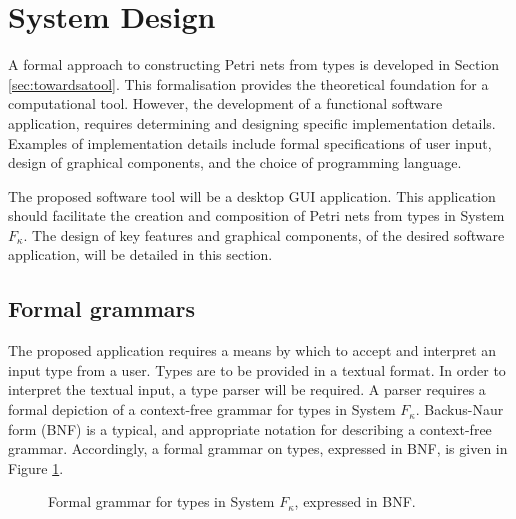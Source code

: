 \documentclass[../Dissertation.tex]{subfiles}
\begin{document}
\section{System Design}
A formal approach to constructing Petri nets from types is developed in Section \ref{sec:towardsatool}. This formalisation provides the theoretical foundation for a computational tool. However, the development of a functional software application, requires determining and designing specific implementation details. Examples of implementation details include formal specifications of user input, design of graphical components, and the choice of programming language. 
\par
The proposed software tool will be a desktop GUI application. This application should facilitate the creation and composition of Petri nets from types in System $F_\kappa$. The design of key features and graphical components, of the desired software application, will  be detailed in this section.

\subsection{Formal grammars}
The proposed application requires a means by which to accept and interpret an input type from a user. Types are to be provided in a textual format. In order to interpret the textual input, a type parser will be required. A parser requires a formal depiction of a context-free grammar for types in System $F_\kappa$. Backus-Naur form (BNF) is a typical, and appropriate notation for describing a context-free grammar. Accordingly, a formal grammar on types, expressed in BNF, is given in Figure \ref{fig:typegrammar}.

\begin{figure}[H]

\caption{Formal grammar for types in System $F_\kappa$, expressed in BNF.}
\label{fig:typegrammar}
\end{figure}
\end{document}
